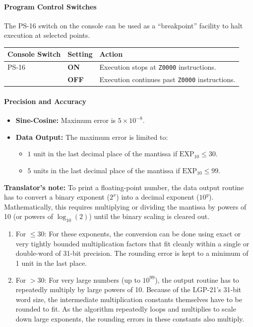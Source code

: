 \paragraph{Program Control Switches}
The \textsf{PS-16} switch on the console can be used as a ``breakpoint'' facility to halt execution at selected points.
\begin{center}
\small
\begin{tabularx}{\textwidth}{llX}
\toprule
\textbf{Console Switch} & \textbf{Setting} & \textbf{Action} \\
\midrule
\textsf{PS-16} & \textbf{ON}  & Execution stops at \texttt{Z0000} instructions. \\
               & \textbf{OFF} & Execution continues past \texttt{Z0000} instructions. \\
\bottomrule
\end{tabularx}
\end{center}

\paragraph{Precision and Accuracy}
\begin{itemize}
	\item \textbf{Sine-Cosine:} Maximum error is $5 \times 10^{-8}$.
	\item \textbf{Data Output:} The maximum error is limited to:
	\begin{itemize}
		\item $1$ unit in the last decimal place of the mantissa if $\text{EXP}_{10} \le 30$.
		\item $5$ units in the last decimal place of the mantissa if $\text{EXP}_{10} \le 99$.
	\end{itemize}
\end{itemize}

\textbf{Translator's note:} To print a floating-point number, the data output routine has to convert a binary exponent ($2^x$) into a decimal exponent ($10^y$). Mathematically, this requires multiplying or dividing the mantissa by powers of 10 (or powers of $\log_{10}(2)$) until the binary scaling is cleared out.
\begin{enumerate}
	\item For $\le 30$: For these exponents, the conversion can be done using exact or very tightly bounded multiplication factors that fit cleanly within a single or double-word of 31-bit precision. The rounding error is kept to a minimum of 1 unit in the last place.
	\item For $> 30$: For very large numbers (up to $10^{99}$), the output routine has to repeatedly multiply by large powers of 10. Because of the LGP-21's 31-bit word size, the intermediate multiplication constants themselves have to be rounded to fit. As the algorithm repeatedly loops and multiplies to scale down large exponents, the rounding errors in these constants also multiply.
\end{enumerate}

